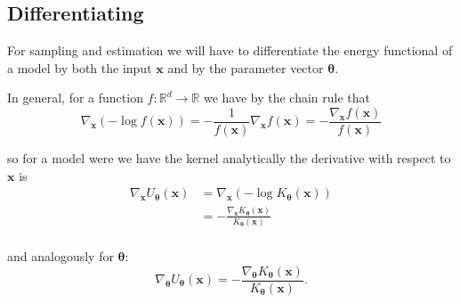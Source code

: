 \subsection{Differentiating}
For sampling and estimation we will have to differentiate the energy functional of a model by both the input $\bm{x}$ and by the parameter vector $\bm{\theta}$.

In general, for a function $f : \mathbb{R}^d \to \mathbb{R}$ we have by the chain rule that
\[
	\nabla_{\bm{x}} (- \log f(\bm{x}) ) = - \frac{ 1 }{ f(\bm{x}) } \nabla_{\bm{x}} f(\bm{x}) = - \frac{ \nabla_{\bm{x}} f(\bm{x}) }{ f(\bm{x}) } 
\]

so for a model were we have the kernel analytically the derivative with respect to $\bm{x}$ is
\[
\begin{aligned}
	\nabla_{\bm{x}} U_{\bm{\theta}} (\bm{x})
	&= \nabla_{\bm{x}} ( - \log K_{\bm{\theta}} (\bm{x}) ) \\
	&= - \frac{ \nabla_{\bm{x}} K_{\bm{\theta}} (\bm{x}) }{ K_{\bm{\theta}} (\bm{x}) }   \\
\end{aligned}
\]

and analogously for $\bm{\theta}$:
\[
	\nabla_{\bm{\theta}} U_{\bm{\theta}} (\bm{x}) = - \frac{ \nabla_{\bm{\theta}} K_{\bm{\theta}} (\bm{x}) }{ K_{\bm{\theta}} (\bm{x}) }.
\]




